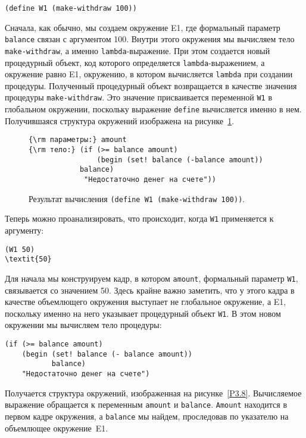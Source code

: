 \begin{Verbatim}[fontsize=\small]
(define W1 (make-withdraw 100))
\end{Verbatim}
Сначала, как обычно, мы создаем окружение E1, где формальный
параметр {\tt balance} связан с аргументом 100. Внутри этого
окружения мы вычисляем тело {\tt make-withdraw}, а именно
{\tt lambda}-выражение. При этом создается новый процедурный
объект, код которого определяется {\tt lambda}-выражением, а
окружение равно E1, окружению, в котором вычисляется {\tt lambda} при
создании процедуры.  Полученный процедурный объект возвращается в
качестве значения процедуры {\tt make-withdraw}.  Это значение
присваивается переменной {\tt W1} в глобальном окружении,
поскольку выражение {\tt define} вычисляется именно в нем.
Получившаяся структура окружений изображена на
рисунке~\ref{P3.7}.


\begin{figure}

\begin{Verbatim}
{\rm параметры:} amount
{\rm тело:} (if (>= balance amount)
                (begin (set! balance (-balance amount))
	        balance)
             "Недостаточно денег на счете"))
\end{Verbatim}
\caption{Результат вычисления {\tt (define W1 (make-withdraw 100))}.}
\label{P3.7}
\end{figure}

Теперь можно проанализировать, что происходит, когда
{\tt W1} применяется к аргументу:

\begin{Verbatim}[fontsize=\small]
(W1 50)
\textit{50}
\end{Verbatim}
Для начала мы конструируем кадр, в котором
{\tt amount}, формальный параметр {\tt W1}, связывается
со значением 50.  Здесь крайне важно заметить, что у этого кадра в
качестве объемлющего окружения выступает не глобальное окружение, а
E1, поскольку именно на него указывает процедурный объект
{\tt W1}.  В этом новом окружении мы вычисляем тело процедуры:

\begin{Verbatim}[fontsize=\small]
(if (>= balance amount)
    (begin (set! balance (- balance amount))
           balance)
    "Недостаточно денег на счете")
\end{Verbatim}
Получается структура окружений, изображенная на
рисунке~\ref{P3.8}.  Вычисляемое выражение обращается к переменным
{\tt amount} и {\tt balance}. {\tt Amount}
находится в первом кадре окружения, а {\tt balance} мы найдем,
проследовав по указателю на объемлющее окружение~E1.


